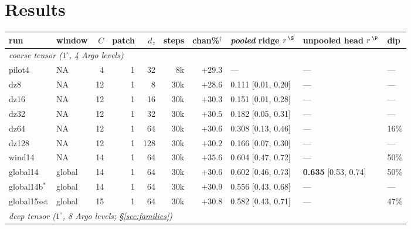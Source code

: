 \documentclass[10pt]{article}
\begin{document}
\section{Results}\label{sec:results}

\begin{table}[p]
\centering\footnotesize
\setlength{\tabcolsep}{3pt}
\begin{tabular}{llrrrrrlll}
\toprule
run & window & $C$ & patch & $d_z$ & steps & chan\%$^\dagger$ &
\emph{pooled} ridge $r^{\,\S}$ & \textbf{unpooled head} $r^{\,\P}$ & dip \\
\midrule
\multicolumn{10}{l}{\emph{coarse tensor ($1^\circ$, 4 Argo levels)}}\\
pilot4          & NA     & 4  & 1 & 32  & 8k  & $+29.3$ & ---                & ---                  & --- \\
dz8             & NA     & 12 & 1 & 8   & 30k & $+28.6$ & 0.111 [0.01, 0.20] & ---                  & --- \\
dz16            & NA     & 12 & 1 & 16  & 30k & $+30.3$ & 0.151 [0.01, 0.28] & ---                  & --- \\
dz32            & NA     & 12 & 1 & 32  & 30k & $+30.5$ & 0.182 [0.05, 0.31] & ---                  & --- \\
dz64            & NA     & 12 & 1 & 64  & 30k & $+30.6$ & 0.308 [0.13, 0.46] & ---                  & 16\% \\
dz128           & NA     & 12 & 1 & 128 & 30k & $+30.2$ & 0.166 [0.07, 0.30] & ---                  & --- \\
wind14          & NA     & 14 & 1 & 64  & 30k & $+35.6$ & 0.604 [0.47, 0.72] & ---                  & 50\% \\
global14        & global & 14 & 1 & 64  & 30k & $+30.6$ & 0.602 [0.46, 0.73] & \textbf{0.635} [0.53, 0.74] & 50\% \\
global14b$^\ast$& global & 14 & 1 & 64  & 30k & $+30.9$ & 0.556 [0.43, 0.68] & ---                  & --- \\
global15sst     & global & 15 & 1 & 64  & 30k & $+30.8$ & 0.582 [0.43, 0.71] & ---                  & 47\% \\
\midrule
\multicolumn{10}{l}{\emph{deep tensor ($1^\circ$, 8 Argo levels; \S\ref{sec:families})}}\\

\end{tabular}
\end{table}
\end{document}
